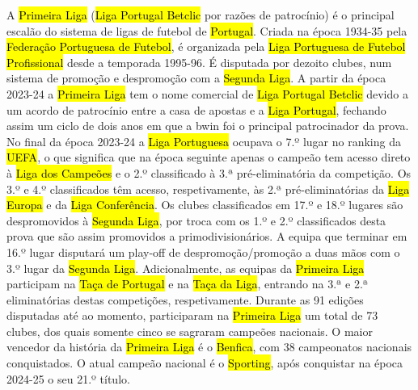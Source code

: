 \documentclass[a4paper,12pt]{article}
\begin{document}
A \hl{Primeira Liga} (\hl{Liga Portugal Betclic} por razões de patrocínio) é o principal escalão do sistema de ligas de futebol de \hl{Portugal}. Criada na época 1934-35 pela \hl{Federação Portuguesa de Futebol}, é organizada pela \hl{Liga Portuguesa de Futebol Profissional} desde a temporada 1995-96. É disputada por dezoito clubes, num sistema de promoção e despromoção com a \hl{Segunda Liga}.
A partir da época 2023-24 a \hl{Primeira Liga} tem o nome comercial de \hl{Liga Portugal Betclic} devido a um acordo de patrocínio entre a casa de apostas e a \hl{Liga Portugal}, fechando assim um ciclo de dois anos em que a bwin foi o principal patrocinador da prova.
No final da época 2023-24 a \hl{Liga Portuguesa} ocupava o 7.º lugar no ranking da \hl{UEFA}, o que significa que na época seguinte apenas o campeão tem acesso direto à \hl{Liga dos Campeões} e o 2.º classificado à 3.ª pré-eliminatória da competição. Os 3.º e 4.º classificados têm acesso, respetivamente, às 2.ª pré-eliminatórias da \hl{Liga Europa} e da \hl{Liga Conferência}.
Os clubes classificados em 17.º e 18.º lugares são despromovidos à \hl{Segunda Liga}, por troca com os 1.º e 2.º classificados desta prova que são assim promovidos a primodivisionários. A equipa que terminar em 16.º lugar disputará um play-off de despromoção/promoção a duas mãos com o 3.º lugar da \hl{Segunda Liga}.
Adicionalmente, as equipas da \hl{Primeira Liga} participam na \hl{Taça de Portugal} e na \hl{Taça da Liga}, entrando na 3.ª e 2.ª eliminatórias destas competições, respetivamente.
Durante as 91 edições disputadas até ao momento, participaram na \hl{Primeira Liga} um total de 73 clubes, dos quais somente cinco se sagraram campeões nacionais. O maior vencedor da história da \hl{Primeira Liga} é o \hl{Benfica}, com 38 campeonatos nacionais conquistados. O atual campeão nacional é o \hl{Sporting}, após conquistar na época 2024-25 o seu 21.º título.
\end{document}
